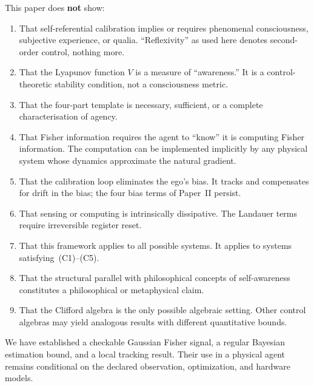 \documentclass[12pt,a4paper,openany]{book}
\begin{document}
\medskip
This paper does \textbf{not} show:
\begin{enumerate}
\item That self-referential calibration implies or requires
  phenomenal consciousness, subjective experience, or
  qualia. ``Reflexivity'' as used here denotes
  second-order control, nothing more.
\item That the Lyapunov function $V$ is a measure of
  ``awareness.'' It is a control-theoretic stability
  condition, not a consciousness metric.
\item That the four-part template is necessary, sufficient, or a
  complete characterisation of agency.
\item That Fisher information requires the agent to
  ``know'' it is computing Fisher information.
  The computation can be implemented implicitly by any
  physical system whose dynamics approximate the natural
  gradient.
\item That the calibration loop eliminates the ego's bias.
  It tracks and compensates for drift in the bias;
  the four bias terms of Paper~II persist.
\item That sensing or computing is intrinsically dissipative.  The
  Landauer terms require irreversible register reset.
\item That this framework applies to all possible systems.
  It applies to systems satisfying~(C1)--(C5).
\item That the structural parallel with philosophical
  concepts of self-awareness constitutes a philosophical
  or metaphysical claim.
\item That the Clifford algebra is the only possible
  algebraic setting. Other control algebras may yield
  analogous results with different quantitative bounds.
\end{enumerate}

\medskip
We have established a checkable Gaussian Fisher signal, a regular
Bayesian estimation bound, and a local tracking result.  Their use in a
physical agent remains conditional on the declared observation,
optimization, and hardware models.



\backmatter
\end{document}

